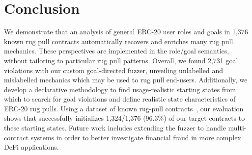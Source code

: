 \section{Conclusion}
\label{ss:sec:conclusion}

We demonstrate that an analysis of general ERC-20 user roles and goals in 1,376 known rug pull contracts automatically recovers and enriches many rug pull mechanics.
These perspectives are implemented in the role/goal semantics, without tailoring to particular rug pull patterns.
Overall, we found 2,731 goal violations with our custom \spoilsport goal-directed fuzzer, unveiling unlabelled and mislabelled mechanics which may be used to rug pull end-users.
Additionally, we develop a declarative methodology to find usage-realistic starting states from which to search for goal violations and define realistic state characteristics of ERC-20 rug pulls.
Using a dataset of known rug-pull contracts~\cite{SoKRugPull2025}, our evaluation shows that \spoilsport{} successfully initializes 1,324/1,376 (96.3\%) of our target contracts to these starting states.
Future work includes extending the \spoilsport fuzzer to handle multi-contract systems in order to better investigate financial fraud in more complex DeFi applications.
